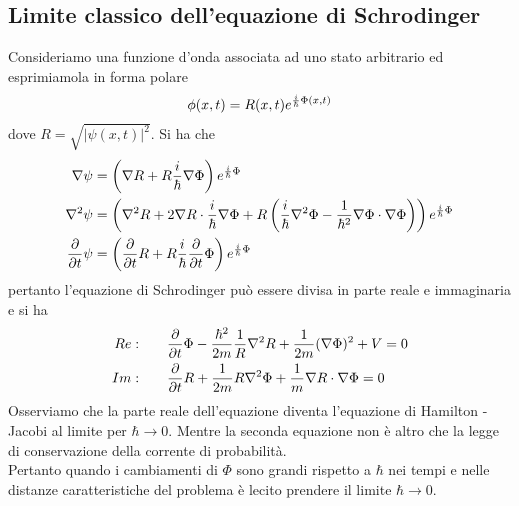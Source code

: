 \documentclass{article}
\begin{document}
\subsection{Limite classico dell'equazione di Schrodinger}
Consideriamo una funzione d'onda associata ad uno stato arbitrario ed esprimiamola in forma polare
\begin{gather}
    \phi(x, t) = R(x, t)e^{\frac{i}{\hbar}\Phi(x, t)} \notag
\end{gather}
dove $R = \sqrt{|\psi(x, t)|^2}$. Si ha che
\begin{align}
    \nabla\psi &= \left( \nabla R + R\frac{i}{\hbar}\nabla \Phi \right)e^{\frac{i}{\hbar}\Phi} \notag \\
    \nabla^2\psi &= \left( \nabla^2R + 2\nabla R \cdot \frac{i}{\hbar}\nabla \Phi + R \left( \frac{i}{\hbar}\nabla^2\Phi - \frac{1}{\hbar^2}\nabla\Phi \cdot \nabla\Phi \right) \right)e^{\frac{i}{\hbar}\Phi} \notag \\
    \frac{\partial}{\partial t}\psi &= \left( \frac{\partial}{\partial t}R + R\frac{i}{\hbar}\frac{\partial}{\partial t}\Phi \right)e^{\frac{i}{\hbar}\Phi} \notag
\end{align}
pertanto l'equazione di Schrodinger può essere divisa in parte reale e immaginaria e si ha
\begin{align}
    Re: \qquad &\frac{\partial}{\partial t}\Phi - \frac{\hbar^2}{2m}\frac{1}{R}\nabla^2R + \frac{1}{2m}(\nabla\Phi)^2 + V = 0 \notag \\
    Im: \qquad &\frac{\partial}{\partial t}R + \frac{1}{2m}R\nabla^2\Phi + \frac{1}{m}\nabla R \cdot \nabla\Phi = 0 \notag
\end{align}
Osserviamo che la parte reale dell'equazione diventa l'equazione di Hamilton - Jacobi al limite per $\hbar \rightarrow 0$. Mentre la seconda equazione non è altro che la legge di conservazione della corrente di probabilità. \\
Pertanto quando i cambiamenti di $\Phi$ sono grandi rispetto a $\hbar$ nei tempi e nelle distanze caratteristiche del problema è lecito prendere il limite $\hbar \rightarrow 0$.
\end{document}
